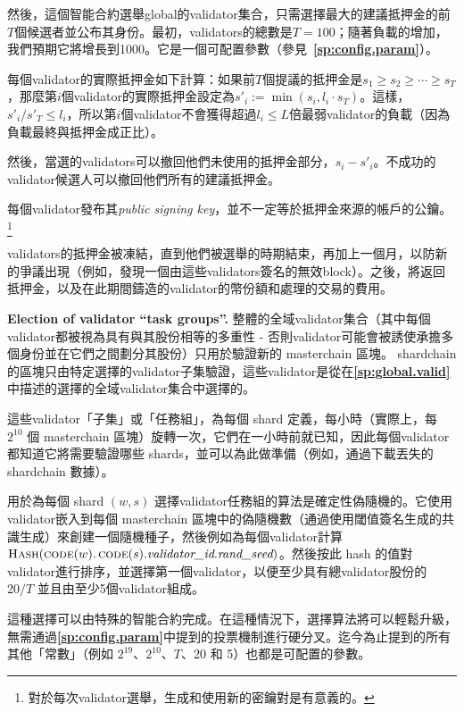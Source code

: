 \documentclass[12pt,oneside]{article}
\def\makepoint#1{\medbreak\noindent{\bf #1.\ }}
\def\nxsubpoint{\refstepcounter{subsubsection}%
  \smallbreak\makepoint{\thesubsubsection}}
\def\refpoint#1{{\rm\textbf{\ref{#1}}}}
\let\ptref=\refpoint
\def\embt(#1.){\textbf{#1.}}
\let\vr=\textit
\def\opsc#1{\operatorname{\textsc{#1}}}
\def\Hash{\opsc{Hash}}
\def\code{\opsc{code}}
\begin{document}
然後，這個智能合約選舉global的validator集合，只需選擇最大的建議抵押金的前$T$個候選者並公布其身份。最初，validators的總數是$T=100$；隨著負載的增加，我們預期它將增長到1000。它是一個可配置參數（參見~\ptref{sp:config.param}）。

每個validator的實際抵押金如下計算：如果前$T$個提議的抵押金是$s_1\geq s_2\geq\cdots\geq s_T$，那麼第$i$個validator的實際抵押金設定為$s'_i:=\min(s_i,l_i\cdot s_T)$。這樣，$s'_i/s'_T\leq l_i$，所以第$i$個validator不會獲得超過$l_i\leq L$倍最弱validator的負載（因為負載最終與抵押金成正比）。

然後，當選的validators可以撤回他們未使用的抵押金部分，$s_i-s'_i$。不成功的validator候選人可以撤回他們所有的建議抵押金。

每個validator發布其{\em public signing key}，並不一定等於抵押金來源的帳戶的公鑰。\footnote{對於每次validator選舉，生成和使用新的密鑰對是有意義的。}

validators的抵押金被凍結，直到他們被選舉的時期結束，再加上一個月，以防新的爭議出現（例如，發現一個由這些validators簽名的無效block）。之後，將返回抵押金，以及在此期間鑄造的validator的幣份額和處理的交易的費用。


\nxsubpoint\label{sp:val.task.grp} \embt(Election of validator ``task
groups''.)  整體的全域validator集合（其中每個validator都被視為具有與其股份相等的多重性 - 否則validator可能會被誘使承擔多個身份並在它們之間劃分其股份）只用於驗證新的 masterchain 區塊。 shardchain 的區塊只由特定選擇的validator子集驗證，這些validator是從在\ptref{sp:global.valid}中描述的選擇的全域validator集合中選擇的。

這些validator「子集」或「任務組」，為每個 shard 定義，每小時（實際上，每 $2^{10}$ 個 masterchain 區塊）旋轉一次，它們在一小時前就已知，因此每個validator都知道它將需要驗證哪些 shards，並可以為此做準備（例如，通過下載丟失的 shardchain 數據）。

用於為每個 shard $(w,s)$ 選擇validator任務組的算法是確定性偽隨機的。它使用validator嵌入到每個 masterchain 區塊中的偽隨機數（通過使用閾值簽名生成的共識生成）來創建一個隨機種子，然後例如為每個validator計算 $\Hash(\code(w).\code(s).\vr{validator\_id}.\vr{rand\_seed})$。然後按此 hash 的值對validator進行排序，並選擇第一個validator，以便至少具有總validator股份的 $20/T$ 並且由至少5個validator組成。

這種選擇可以由特殊的智能合約完成。在這種情況下，選擇算法將可以輕鬆升級，無需通過\ptref{sp:config.param}中提到的投票機制進行硬分叉。迄今為止提到的所有其他「常數」（例如 $2^{19}$、$2^{10}$、$T$、20 和 5）也都是可配置的參數。
\end{document}
